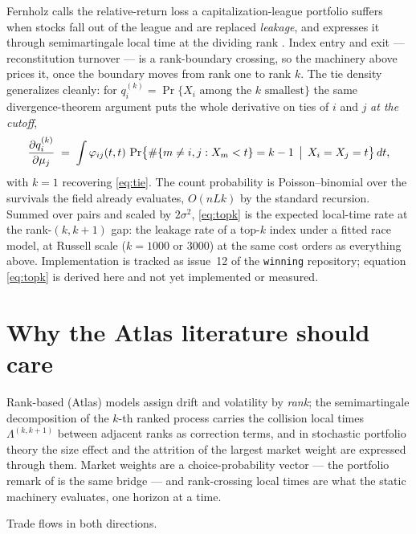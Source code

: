 \documentclass[11pt]{article}
\begin{document}
Fernholz calls the relative-return loss a capitalization-league
portfolio suffers when stocks fall out of the league and are replaced
\emph{leakage}, and expresses it through semimartingale local time at
the dividing rank \citep{fernholz2002}. Index entry and exit ---
reconstitution turnover --- is a rank-boundary crossing, so the
machinery above prices it, once the boundary moves from rank one to
rank $k$. The tie density generalizes cleanly: for
$q^{(k)}_i = \Pr\{X_i \text{ among the } k \text{ smallest}\}$ the
same divergence-theorem argument puts the whole derivative on ties of
$i$ and $j$ \emph{at the cutoff},
\begin{equation}\label{eq:topk}
\frac{\partial q^{(k)}_i}{\partial \mu_j}
\;=\; \int \varphi_{ij}(t,t)\,
\Pr\bigl\{\#\{m\ne i,j : X_m < t\} = k-1 \,\bigm|\, X_i=X_j=t\bigr\}\,dt ,
\end{equation}
with $k=1$ recovering \eqref{eq:tie}. The count probability is
Poisson--binomial over the survivals the field already evaluates,
$O(nLk)$ by the standard recursion. Summed over pairs and scaled by
$2\sigma^2$, \eqref{eq:topk} is the expected local-time rate at the
rank-$(k,k+1)$ gap: the leakage rate of a top-$k$ index under a fitted
race model, at Russell scale ($k=1000$ or $3000$) at the same cost
orders as everything above. Implementation is tracked as issue~12 of
the \texttt{winning} repository; equation \eqref{eq:topk} is derived
here and not yet implemented or measured.

\section{Why the Atlas literature should care}

Rank-based (Atlas) models \citep{fernholz2002,banner2005} assign drift and volatility by \emph{rank}; the semimartingale
decomposition of the $k$-th ranked process carries the collision local
times $\Lambda^{(k,k+1)}$ between adjacent ranks as correction terms,
and in stochastic portfolio theory the size effect and the attrition of
the largest market weight are expressed through them. Market weights
are a choice-probability vector --- the portfolio remark of
\citet{cotton2026} is the same bridge --- and rank-crossing local times
are what the static machinery evaluates, one horizon at a time.

Trade flows in both directions.
\end{document}
